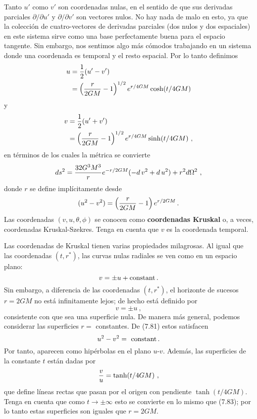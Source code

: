 \documentclass[11pt,b5paper,openany,twoside]{book}
\begin{document}
Tanto $u'$ como $v'$ son coordenadas nulas, en el sentido de que sus derivadas parciales $\partial/\partial u'$ y $\partial/\partial v'$ son vectores nulos.
No hay nada de malo en esto, ya que la colección de cuatro-vectores de derivadas parciales (dos nulos y dos espaciales) en este sistema sirve como una base perfectamente buena para el espacio tangente.
Sin embargo, nos sentimos algo más cómodos trabajando en un sistema donde una coordenada es temporal y el resto espacial.
Por lo tanto definimos
\begin{align}
u  &=  {1\over 2}(u'-v') \notag \\
&=  \left({{r}\over{2GM}}-1\right)^{1/2}e^{r/4GM}\cosh(t/4GM)
\label{7.78}
\end{align}
y
\begin{align}
v  &=  {1\over 2}(u'+v') \notag \\
&=  \left({{r}\over{2GM}}-1\right)^{1/2}e^{r/4GM}\sinh(t/4GM)\ ,
\label{7.79}
\end{align}
en términos de los cuales la métrica se convierte
\begin{equation}
ds^2 ={{32 G^3M^3}\over{r}}e^{-r/2GM}(- d\,v^2+ d\,u^2)
+r^2 d\Omega^2\ ,\label{7.80}
\end{equation}
donde $r$ se define implícitamente desde
\begin{equation}
(u^2-v^2)=
\left({{r}\over{2GM}}-1\right)e^{r/2GM}\,.\label{7.81}
\end{equation}
Las coordenadas $(v,u,\theta,\phi)$ se conocen como {\bf coordenadas Kruskal} o, a veces, coordenadas Kruskal-Szekres.
Tenga en cuenta que $v$ es la coordenada temporal.

Las coordenadas de Kruskal tienen varias propiedades milagrosas.
Al igual que las coordenadas $(t,r^*)$, las curvas nulas radiales se ven como en un espacio plano:
\begin{equation}
v= \pm u + {\rm constant}\,.\label{7.82}
\end{equation}
Sin embargo, a diferencia de las coordenadas $(t,r^*)$, el horizonte de sucesos $r=2GM$ no está infinitamente lejos; de hecho está definido por
\begin{equation}
v = \pm u\ ,\label{7.83}
\end{equation}
consistente con que sea una superficie nula.
De manera más general, podemos considerar las superficies $r=$ constantes.
De (7.81) estos satisfacen
\begin{equation}
u^2-v^2 = {\rm ~constant}\,.\label{7.84}
\end{equation}
Por tanto, aparecen como hipérbolas en el plano $u$-$v$.
Además, las superficies de la constante $t$ están dadas por
\begin{equation}
{v\over u} = \tanh(t/4GM)\ ,\label{7.85}
\end{equation}
que define líneas rectas que pasan por el origen con pendiente $\tanh(t/4GM)$.
Tenga en cuenta que como $t\rightarrow \pm\infty$ esto se convierte en lo mismo que (7.83); por lo tanto estas superficies son iguales que $r=2GM$.
\end{document}
